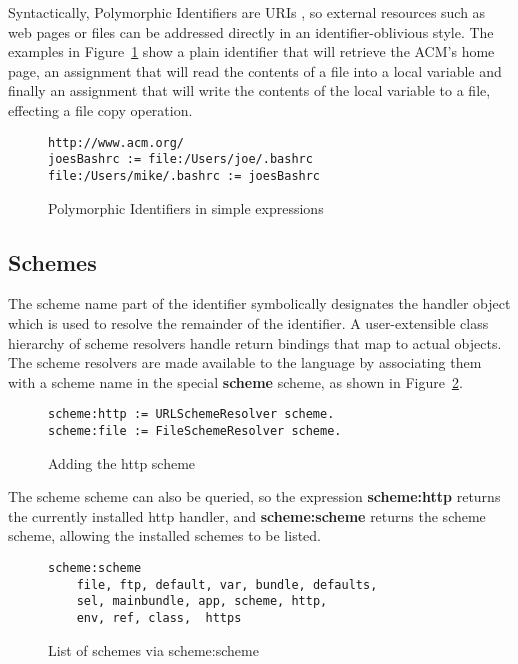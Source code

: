 \documentclass[preprint,authoryear]{acm_proc_article-sp}
\begin{document}
Syntactically, Polymorphic Identifiers are URIs \cite{rfc3986}, so external resources
such as web pages or files can be addressed directly in an identifier-oblivious
style.  The examples in Figure~\ref{first-polymorphic-examples} show a plain
identifier that will retrieve the ACM's home page, an assignment that will read
the contents of a file into a local variable and finally an assignment that will
write the contents of the local variable to a file, effecting a file copy operation.


\begin{figure}[htbp]
\begin{center}
\begin{verbatim}
http://www.acm.org/
joesBashrc := file:/Users/joe/.bashrc
file:/Users/mike/.bashrc := joesBashrc
\end{verbatim}
\caption{Polymorphic Identifiers in simple expressions}
\label{first-polymorphic-examples}
\end{center}
\end{figure}

\subsection{Schemes}

The scheme name part of the identifier symbolically designates the handler object which 
is used to resolve the remainder of the identifier.   A user-extensible class hierarchy of
scheme resolvers handle 
return bindings that map to actual objects. The scheme resolvers are made available to the 
language by associating them with a scheme name in the special {\bf scheme} scheme,
as shown in Figure~\ref{scheme-scheme-http}. 

\begin{figure}[htbp]
\begin{center}
\begin{verbatim}
scheme:http := URLSchemeResolver scheme.
scheme:file := FileSchemeResolver scheme.
\end{verbatim}
\caption{Adding the http scheme}
\label{scheme-scheme-http}
\end{center}
\end{figure}

The scheme scheme can also be queried,
so the expression {\bf scheme:http} returns the currently installed http handler, and 
{\bf scheme:scheme} returns the scheme scheme, allowing the installed schemes to
be listed.

\begin{figure}[htbp]
\begin{center}
\begin{verbatim}
scheme:scheme
    file, ftp, default, var, bundle, defaults, 
    sel, mainbundle, app, scheme, http,
    env, ref, class,  https
\end{verbatim}
\caption{List of schemes via scheme:scheme}
\label{scheme-scheme}
\end{center}
\end{figure}
\end{document}
